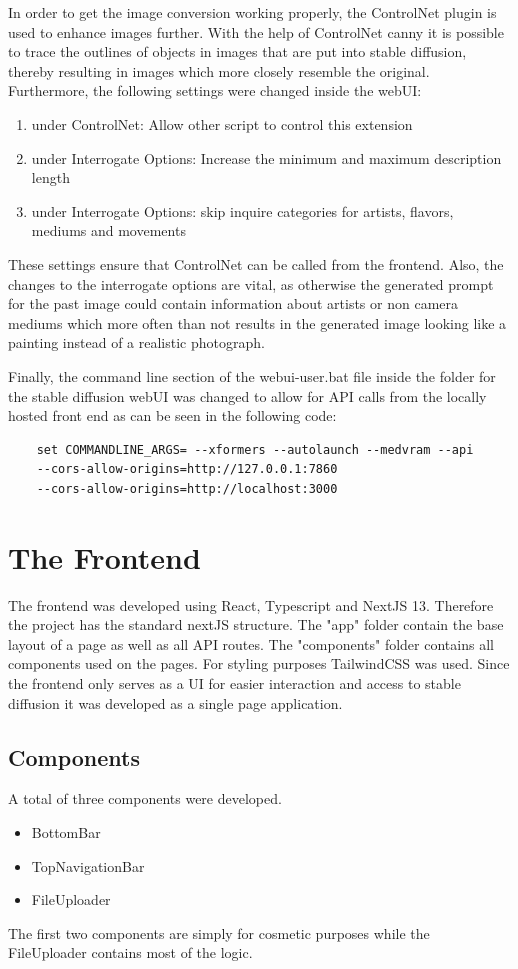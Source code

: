 \documentclass[english,notitlepage,smartquotes]{hgbreport}
\begin{document}
In order to get the image conversion working properly, the ControlNet plugin \cite{controllNet} is used to enhance images further. With the help of ControlNet canny it is possible to trace the outlines of objects in images that are put into stable diffusion, thereby resulting in images which more closely resemble the original.
Furthermore, the following settings were changed inside the webUI:
\begin{enumerate}
    \item under ControlNet: Allow other script to control this extension
    \item under Interrogate Options: Increase the minimum and maximum description length 
    \item under Interrogate Options: skip inquire categories for artists, flavors, mediums and movements 
\end{enumerate}
These settings ensure that ControlNet can be called from the frontend. Also, the changes to the interrogate options are vital, as otherwise the generated prompt for the past image could contain information about artists or non camera mediums which more often than not results in the generated image looking like a painting instead of a realistic photograph.

Finally, the command line section of the webui-user.bat file inside the folder for the stable diffusion webUI was changed to allow for API calls from the locally hosted front end as can be seen in the following code:

\begin{verbatim}
    set COMMANDLINE_ARGS= --xformers --autolaunch --medvram --api 
    --cors-allow-origins=http://127.0.0.1:7860 
    --cors-allow-origins=http://localhost:3000
\end{verbatim}

\section{The Frontend}
The frontend was developed using React, Typescript and NextJS 13. Therefore the project has the standard nextJS structure. The "app" folder contain the base layout of a page as well as all API routes. The "components" folder contains all components used on the pages. For styling purposes TailwindCSS was used. Since the frontend only serves as a UI for easier interaction and access to stable diffusion it was developed as a single page application.

\subsection{Components}
A total of three components were developed. \begin{itemize}
    \item BottomBar 
    \item TopNavigationBar
    \item FileUploader
\end{itemize}
The first two components are simply for cosmetic purposes while the FileUploader contains most of the logic.
\end{document}

